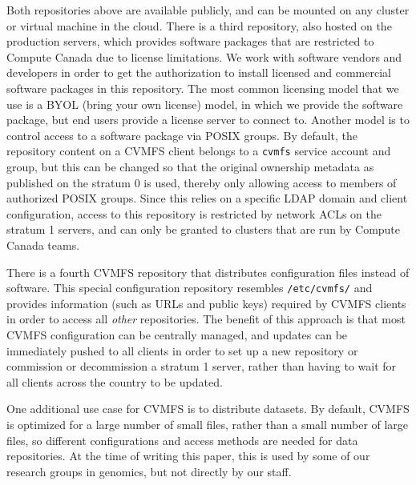 \documentclass[sigconf]{acmart}
\begin{document}
Both repositories above are available publicly, and can be mounted on any cluster or virtual machine in the cloud. There is a third repository, also hosted on the production servers, which provides software packages that are restricted to Compute Canada due to license limitations. We work with software vendors and developers in order to get the authorization to install licensed and commercial software packages in this repository. The most common licensing model that we use is a BYOL (bring your own license) model, in which we provide the software package, but end users provide a license server to connect to. Another model is to control access to a software package via POSIX groups. By default, the repository content on a CVMFS client belongs to a \texttt{cvmfs} service account and group, but this can be changed so that the original ownership metadata as published on the stratum 0 is used, thereby only allowing access to members of authorized POSIX groups. Since this relies on a specific LDAP domain and client configuration, access to this repository is restricted by network ACLs on the stratum 1 servers, and can only be granted to clusters that are run by Compute Canada teams. 

There is a fourth CVMFS repository that distributes configuration files instead of software. This special configuration repository resembles \texttt{/etc/cvmfs/} and provides information (such as URLs and public keys) required by CVMFS clients in order to access all {\it other} repositories. The benefit of this approach is that most CVMFS configuration can be centrally managed, and updates can be immediately pushed to all clients in order to set up a new repository or commission or decommission a stratum 1 server, rather than having to wait for all clients across the country to be updated.

One additional use case for CVMFS is to distribute datasets. By default, CVMFS  is optimized for a large number of small files, rather than a small number of large files, so different  configurations and access methods are needed for data repositories. At the time of writing this paper, this is used by some of our research groups in genomics, but not directly by our staff. 
\end{document}
